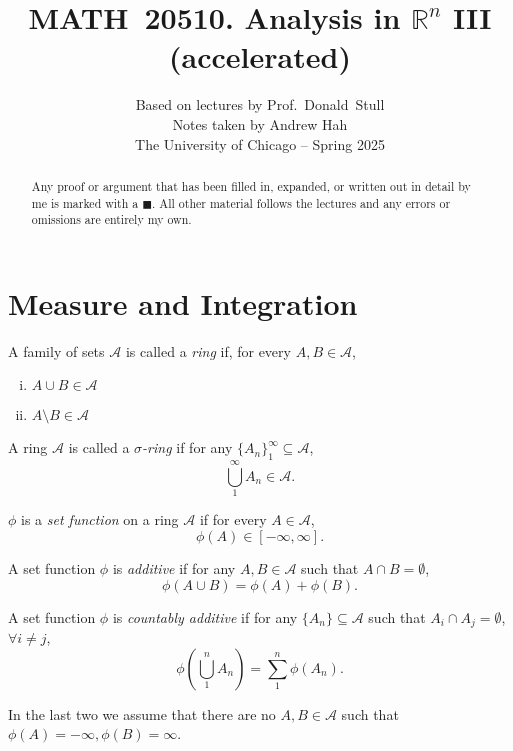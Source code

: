 \documentclass[11pt]{article}
\title{MATH 20510. Analysis in \(\mathbb{R}^n\) III  (accelerated)}
\author{%
  Based on lectures by Prof.\ Donald Stull\\
  {\large Notes taken by Andrew Hah}\\[2ex]
  {\normalsize The University of Chicago – Spring 2025}
}
\date{}  %
\begin{document}
\maketitle
\thispagestyle{empty}

\vspace*{-1em}
\noindent
\begin{abstract} Any proof or argument that has been filled in, expanded, or written out in detail by me is marked with a \(\blacksquare\).  
  All other material follows the lectures and any errors or omissions are entirely my own.
  \end{abstract}

\vspace{2em}
\noindent
\tableofcontents

\newpage


\section{Measure and Integration}

\begin{definition}
    A family of sets $\mathscr{A}$ is called a \emph{ring} if, for every $A, B \in \mathscr{A}$, \begin{enumerate} [(i), nosep, left=0pt]
        \item $A \cup B \in \mathscr{A}$
        \item $A \setminus B \in \mathscr{A}$
    \end{enumerate}
\end{definition}

\begin{definition}
    A ring $\mathscr{A}$ is called a \emph{$\sigma$-ring} if for any $\{ A_n \}_1^\infty \subseteq \mathscr{A}$, $$\bigcup_1^\infty A_n \in \mathscr{A}.$$
\end{definition}

\begin{definition}
    $\phi$ is a \emph{set function} on a ring $\mathscr{A}$ if for every $A \in \mathscr{A}$, $$\phi(A) \in [-\infty, \infty].$$
\end{definition}

\begin{definition}
    A set function $\phi$ is \emph{additive} if for any $A, B \in \mathscr{A}$ such that $A \cap B = \emptyset$, $$\phi(A \cup B) = \phi(A) + \phi(B).$$
\end{definition}

\begin{definition}
    A set function $\phi$ is \emph{countably additive} if for any $\{ A_n \} \subseteq \mathscr{A}$ such that $A_i \cap A_j = \emptyset$, $\forall i \neq j$, $$\phi \left( \bigcup_1^n A_n \right) = \sum_1^n \phi(A_n).$$
\end{definition}
In the last two we assume that there are no $A, B \in \mathscr{A}$ such that $\phi(A) = -\infty, \phi(B) = \infty$. 
\end{document}
